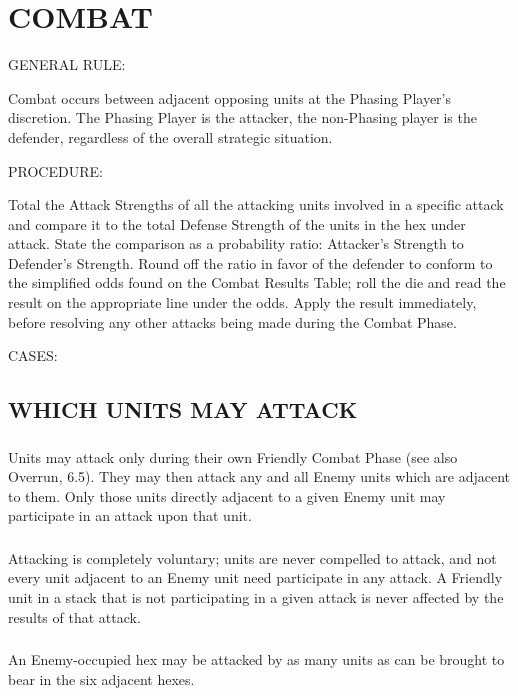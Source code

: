 \clearpage
\section{COMBAT}

GENERAL RULE:

Combat occurs between adjacent opposing units at the Phasing Player's discretion. The Phasing Player is the attacker, the non-Phasing player is the defender, regardless of the overall strategic situation.

PROCEDURE:

Total the Attack Strengths of all the attacking units involved in a specific attack and compare it to the total Defense Strength of the units in the hex under attack. State the comparison as a probability ratio: Attacker's Strength to Defender's Strength. Round off the ratio in favor of the defender to conform to the simplified odds found on the Combat Results Table; roll the die and read the result on the appropriate line under the odds. Apply the result immediately, before resolving any other attacks being made during the Combat Phase.

CASES:

\subsection{WHICH UNITS MAY ATTACK}

\subsubsection{} Units may attack only during their own Friendly Combat Phase (see also Overrun, 6.5). They may then attack any and all Enemy units which are adjacent to them. Only those units directly adjacent to a given Enemy unit may participate in an attack upon that unit.

\subsubsection{} Attacking is completely voluntary; units are never compelled to attack, and not every unit adjacent to an Enemy unit need participate in any attack. A Friendly unit in a stack that is not participating in a given attack is never affected by the results of that attack.

\subsubsection{} An Enemy-occupied hex may be attacked by as many units as can be brought to bear in the six adjacent hexes.

